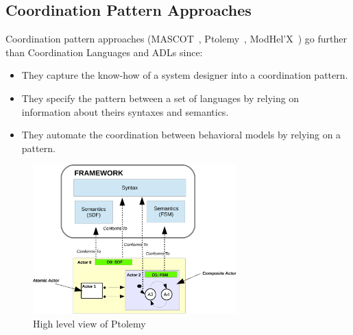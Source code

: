 \subsection{Coordination Pattern Approaches}
Coordination pattern approaches (\eg MASCOT~\cite{mascotbib}, Ptolemy~\cite{ptoleframebib}, ModHel'X~\cite{modhelxbib}) go further than Coordination Languages and ADLs since:          
\begin{itemize}
   \item They capture the know-how of a system designer into a coordination pattern. 
   \item They specify the pattern between a set of languages by relying on information about theirs syntaxes and semantics. 
   \item They automate the coordination between behavioral models by relying on a pattern.
\end{itemize}     	     	
\begin{figure}
\begin{center}
\includegraphics[width=0.7\textwidth]{background/figs/ptolemyfig}
\caption{High level view of Ptolemy~\cite{giraultbib}}
         			\label{fig:ptolemyfig}
         		\end{center}
\end{figure}
         	
